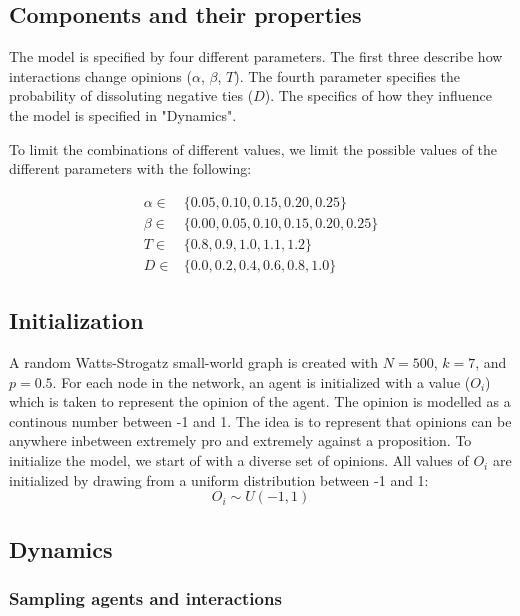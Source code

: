 \documentclass{article}
\begin{document}
\subsection{Components and their properties}
The model is specified by four different parameters. 
The first three describe how interactions change opinions ($\alpha$, $\beta$, $T$). 
The fourth parameter specifies the probability of dissoluting negative ties ($D$).
The specifics of how they influence the model is specified in "Dynamics".  

To limit the combinations of different values, we limit the possible values of the different parameters with the following:


\begin{align*}
    \alpha \in & \{0.05, 0.10, 0.15, 0.20, 0.25\} \\
    \beta \in & \{0.00, 0.05, 0.10, 0.15, 0.20, 0.25\}\\
    T \in & \{0.8, 0.9, 1.0, 1.1, 1.2\}\\
    D \in & \{0.0, 0.2, 0.4, 0.6, 0.8, 1.0\}
\end{align*}


\subsection{Initialization}
A random Watts-Strogatz small-world graph is created 
with $N=500$, $k=7$, and $p=0.5$. For each node in the network,
an agent is initialized with a value ($O_i$) which is taken to represent the opinion of the agent. The opinion is modelled as a continous number between -1 and 1. 
The idea is to represent that opinions can be anywhere inbetween extremely pro and extremely against a proposition.
To initialize the model, we start of with a diverse set of opinions. All values of $O_i$ are initialized by drawing from a uniform distribution between -1 and 1: 
$$O_i \sim U(-1, 1)$$

\subsection{Dynamics}

\subsubsection{Sampling agents and interactions}
\end{document}
